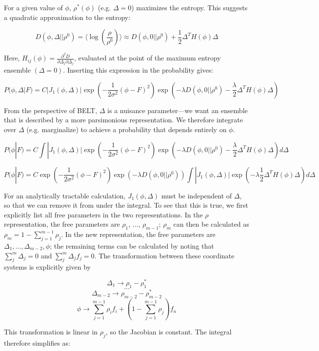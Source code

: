 \documentclass[12pt]{article}
\begin{document}
For a given value of $\phi$, $\rho^*(\phi)$ (e.g. $\Delta = 0$) maximizes the entropy.  This suggests a quadratic approximation to the entropy:

$$D(\phi, \Delta|| \rho^0) = \langle \log(\frac{\rho}{\rho^0})\rangle \approx D(\phi, 0|| \rho^0) + \frac{1}{2} \Delta^T H(\phi) \Delta$$

Here, $H_{ij}(\phi) = \frac{\partial^2 D}{\partial \Delta_j \partial \Delta_j}$, evaluated at the point of the maximum entropy ensemble $(\Delta = 0)$.  Inserting this expression in the probability gives:

$$P(\phi, \Delta | F) = C |J_1(\phi, \Delta)| \exp(-\frac{1}{2\sigma^2} (\phi - F)^2) \exp(-\lambda  D(\phi, 0|| \rho^0) - \frac{\lambda}{2} \Delta^T H(\phi) \Delta)$$

From the perspective of BELT, $\Delta$ is a nuisance parameter---we want an ensemble that is described by a more parsimonious representation.  We therefore integrate over $\Delta$ (e.g. marginalize) to achieve a probability that depends entirely on $\phi$.  

$$P(\phi | F) = C \int |J_1(\phi, \Delta)| \exp(-\frac{1}{2\sigma^2} (\phi - F)^2) \exp(-\lambda  D(\phi, 0|| \rho^0) - \frac{\lambda}{2} \Delta^T H(\phi) \Delta) d\Delta $$

$$P(\phi | F) = C \exp(-\frac{1}{2\sigma^2} (\phi - F)^2) \exp(-\lambda  D(\phi, 0|| \rho^0))  \int |J_1(\phi, \Delta)|  \exp(-\lambda \frac{1}{2} \Delta^T H(\phi) \Delta) d\Delta $$

For an analytically tractable calculation, $J_1(\phi, \Delta)$ must be independent of $\Delta$, so that we can remove it from under the integral.  To see that this is true, we first explicitly list all free parameters in the two representations.  In the $\rho$ representation, the free parameters are $\rho_1$, ..., $\rho_{m-1}$; $\rho_m$ can then be calculated as $\rho_m = 1 - \sum_{j=1}^{m-1} \rho_j$.  In the new representation, the free parameters are $\Delta_1, ..., \Delta_{m-2}, \phi$; the remaining terms can be calculated by noting that $\sum_j^m \Delta_j = 0$ and $\sum_j^m \Delta_j f_j = 0$.  The transformation between these coordinate systems is explicitly given by

$$\Delta_1 \rightarrow \rho_1 - \rho_1^*$$
$$...$$
$$\Delta_{m-2} \rightarrow \rho_{m-2} - \rho_{m-2}^*$$
$$\phi \rightarrow \sum_{j=1}^{m-1} \rho_i f_i + (1 - \sum_{j=1}^{m-1} \rho_j) f_n$$

This transformation is linear in $\rho_j$, so the Jacobian is constant.  The integral therefore simplifies as:
\end{document}
